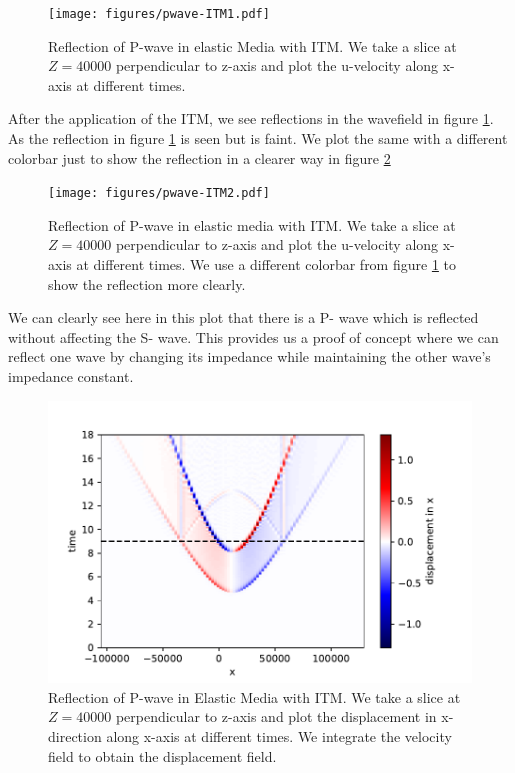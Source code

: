 \begin{figure}
    \centering
    \texttt{[image: figures/pwave-ITM1.pdf]}
    \caption{Reflection of P-wave in elastic Media with \ac{ITM}. We take a slice at $Z=40000$ perpendicular to z-axis
    and plot the u-velocity along x-axis at different times.}
    \label{fig:space-timeplot-pwave}
\end{figure}

After the application of the \ac{ITM}, we see reflections in the wavefield in figure \ref{fig:space-timeplot-pwave}.
As the reflection in figure \ref{fig:space-timeplot-pwave} is seen but is faint. We plot the same with a different colorbar just to show the reflection in a clearer
way in figure \ref{fig:space-timeplot-pwave2}

\begin{figure} %
    \centering
    \texttt{[image: figures/pwave-ITM2.pdf]}
    \caption{Reflection of P-wave in elastic media with \ac{ITM}. We take a slice at $Z=40000$ perpendicular to z-axis
    and plot the u-velocity along x-axis at different times. We use a different colorbar from figure \ref{fig:space-timeplot-pwave} to show the reflection more clearly.}
    \label{fig:space-timeplot-pwave2}
\end{figure}

We can clearly see here in this plot that there is a P- wave which is reflected without affecting the S- wave. This provides us a proof of concept where we 
can reflect one wave by changing its impedance while maintaining the other wave's impedance constant. \\

\begin{figure} %
    \centering
    \includegraphics[width=0.75\linewidth]{figures/pwave-ITMdisplacement.pdf}
    \caption{Reflection of P-wave in Elastic Media with \ac{ITM}. We take a slice at $Z=40000$ perpendicular to z-axis
    and plot the displacement in x-direction along x-axis at different times. We integrate the velocity field to obtain the displacement field.}
    \label{fig:space-timeplot-pwavedisplacement}
\end{figure}

